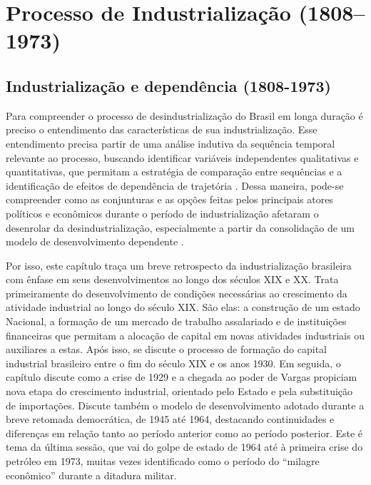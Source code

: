 \chapter{Processo de Industrialização (1808--1973)}

\section{Industrialização e dependência (1808-1973)}\label{industrializauxe7uxe3o-e-dependuxeancia-1808-1973}

Para compreender o processo de desindustrialização do Brasil em longa
duração é preciso o entendimento das características de sua
industrialização. Esse entendimento precisa partir de uma análise
indutiva da sequência temporal relevante ao processo, buscando
identificar variáveis independentes qualitativas e quantitativas, que
permitam a estratégia de comparação entre sequências
\citep{mahoneyfalleti2015} e a identificação de efeitos de dependência de trajetória
\citep{mahoney2000,pierson2015}. Dessa maneira, pode-se compreender como as conjunturas
e as opções feitas pelos principais atores políticos e econômicos
durante o período de industrialização afetaram o desenrolar da
desindustrialização, especialmente a partir da consolidação de um modelo
de desenvolvimento dependente \citep{evans_dependent_1979}.

Por isso, este capítulo traça um breve retrospecto da industrialização
brasileira com ênfase em seus desenvolvimentos ao longo dos séculos XIX
e XX. Trata primeiramente do desenvolvimento de condições necessárias ao
crescimento da atividade industrial ao longo do século XIX. São elas: a
construção de um estado Nacional, a formação de um mercado de trabalho
assalariado e de instituições financeiras que permitam a alocação de
capital em novas atividades industriais ou auxiliares a estas. Após
isso, se discute o processo de formação do capital industrial brasileiro
entre o fim do século XIX e os anos 1930. Em seguida, o capítulo discute
como a crise de 1929 e a chegada ao poder de Vargas propiciam nova etapa
do crescimento industrial, orientado pelo Estado e pela substituição de
importações. Discute também o modelo de desenvolvimento adotado durante
a breve retomada democrática, de 1945 até 1964, destacando continuidades
e diferenças em relação tanto ao período anterior como ao período
posterior. Este é tema da última sessão, que vai do golpe de estado de
1964 até à primeira crise do petróleo em 1973, muitas vezes identificado
como o período do ``milagre econômico'' durante a ditadura militar.

